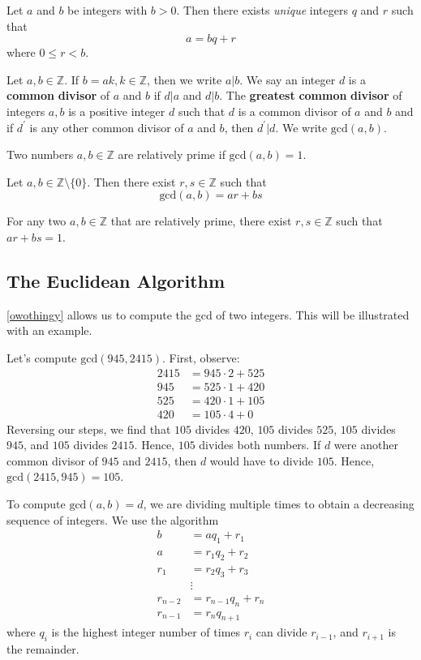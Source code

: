 \documentclass[12pt, letterpaper]{report}
\begin{document}
\begin{theorem}\label{divalg}
	Let \(a\) and \(b\) be integers with \(b>0\). Then there exists \emph{unique} integers \(q\) and \(r\) such that 
	\[
		a=bq+r
	\]
	where \(0\leq r<b\).
\end{theorem}
Let \(a,b\in\mathbb{Z} \). If \(b=ak,k\in\mathbb{Z} \), then we write \(a|b\). We say an integer \(d\) is a \textbf{common} \textbf{divisor} of \(a\) and \(b\) if \(d|a\) and \(d|b\). The \textbf{greatest} \textbf{common} \textbf{divisor} of integers \(a,b\) is a positive integer \(d\) such that \(d\) is a common divisor of \(a\) and \(b\) and if \(d^{\prime} \) is any other common divisor of \(a\) and \(b\), then \(d^{\prime} |d\). We write \(\text{gcd}(a,b) \).
\begin{definition}
	Two numbers \(a,b\in\mathbb{Z} \) are relatively prime if \(\text{gcd}(a,b)=1 \).
\end{definition}
\begin{theorem}\label{owothingy}
	Let \(a,b\in\mathbb{Z} \setminus \{ 0 \} \). Then there exist \(r,s\in\mathbb{Z} \) such that 
	\[
		\text{gcd}(a,b)=ar+bs 
	\]
\end{theorem}
\begin{corollary}
	For any two \(a,b\in\mathbb{Z} \) that are relatively prime, there exist \(r,s\in\mathbb{Z} \) such that \(ar+bs=1\).
\end{corollary}
\subsection*{The Euclidean Algorithm}
\ref{owothingy} allows us to compute the gcd of two integers. This will be illustrated with an example.
\begin{eg}
	Let's compute \(\text{gcd}(945,2415) \). First, observe:
	\begin{align*}
		2415&=945\cdot2+525\\
		945&=525\cdot1+420\\
		525&=420\cdot1+105\\
		420&=105\cdot4+0
	\end{align*}
	Reversing our steps, we find that \(105\) divides \(420\), \(105\) divides \(525\), \(105\) divides \(945\), and \(105\) divides \(2415\). Hence, \(105\) divides both numbers. If \(d\) were another common divisor of \(945\) and \(2415\), then \(d\) would have to divide \(105.\) Hence, \(\text{gcd}(2415,945)=105 \).
\end{eg}
To compute \(\text{gcd}(a,b) =d\), we are dividing multiple times to obtain a decreasing sequence of integers. We use the algorithm
\begin{align*}
	b&=aq_1 +r_1\\
	a&=r_1 q_2 +r_2\\
	r_1&=r_2 q_3 +r_3\\
	&\vdots\\
	r_{n-2}&=r_{n-1}q_n +r_n\\
	r_{n-1}&=r_n q_{n+1}
\end{align*}
where \(q_i\) is the highest integer number of times \(r_i\) can divide \(r_{i-1} \), and \(r_{i+1} \) is the remainder. 
\end{document}
